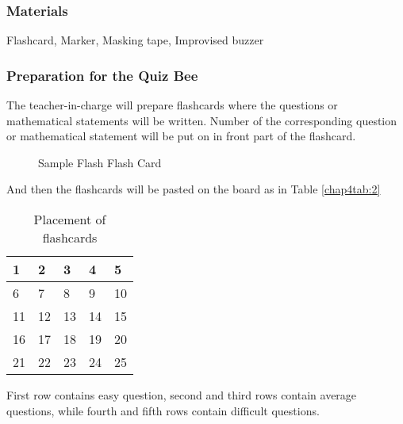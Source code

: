 \subsubsection*{Materials}
Flashcard, Marker, Masking tape, Improvised buzzer
\subsubsection*{Preparation for the Quiz Bee}
The teacher-in-charge will prepare flashcards where the questions or mathematical statements will
be written. Number of the corresponding question or mathematical statement will be put on in front
part of the flashcard.
\begin{figure}[!h]
\centering
\caption{Sample Flash Flash Card}
\qquad
{}%
\end{figure}
And then the flashcards will be pasted on the board as in Table \eqref{chap4tab:2}
\begin{table}[!h]
\centering
\caption{Placement of flashcards}
\begin{tabular}{|l|l|l|l|l|}
\hline
1 & 2 & 3 & 4 & 5\\ \hline
6 & 7 & 8 & 9 & 10\\ \hline
11 & 12 & 13 & 14 & 15\\ \hline
16 & 17 & 18 & 19 & 20\\ \hline
21 & 22 & 23 & 24 & 25\\ \hline
\end{tabular}
\label{chap4tab:2}
\end{table}
First row contains easy question, second and third rows contain average questions, while fourth and
fifth rows contain difficult questions.
